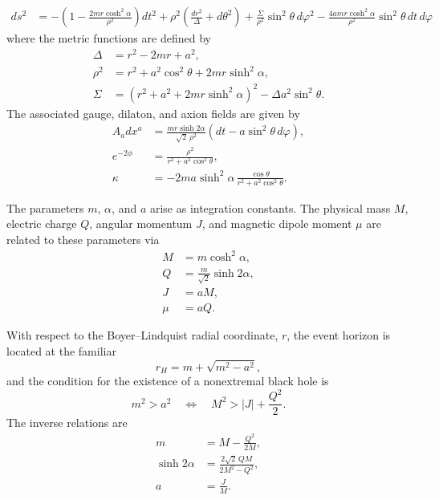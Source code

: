 \begin{align}
ds^2 &= -\left(1-\frac{2mr\cosh^2\alpha}{\rho^2}\right)dt^2 + \rho^2\left(\frac{dr^2}{\Delta}+d\theta^2\right) +\frac{\Sigma}{\rho^2}\sin^2\theta\, d\varphi^2
-\frac{4amr\cosh^2\alpha}{\rho^2}\sin^2\theta\, dt\, d\varphi
\end{align}
where the metric functions are defined by
\begin{align}
\Delta &= r^2 - 2mr + a^2, \\
\rho^2 &= r^2 + a^2\cos^2\theta + 2mr\sinh^2\alpha, \\
\Sigma &= \left(r^2 + a^2 + 2mr\sinh^2\alpha\right)^2
         - \Delta a^2 \sin^2\theta.
\end{align}
The associated gauge, dilaton, and axion fields are given by
\begin{align}
A_a dx^a &= \frac{mr \sinh 2\alpha}{\sqrt{2}\,\rho^2}
\left(dt - a \sin^2\theta \, d\varphi \right), \\
e^{-2\phi} &= \frac{\rho^2}{r^2 + a^2 \cos^2\theta},
\label{Kerr-Sen_dilaton} \\
\kappa &= -2ma \sinh^2\alpha \,
\frac{\cos\theta}{r^2 + a^2 \cos^2\theta}.
\label{Kerr-Sen_axion}
\end{align}

The parameters $m$, $\alpha$, and $a$ arise as integration constants. The physical mass $M$, electric charge $Q$, angular momentum $J$, and magnetic dipole moment $\mu$ are related to these parameters via
\begin{align}
M &= m \cosh^2\alpha, \\
Q &= \frac{m}{\sqrt{2}} \sinh 2\alpha, \\
J &= aM, \\
\mu &= aQ.
\end{align}

With respect to the Boyer--Lindquist radial coordinate, $r$, the event horizon is located at the familiar 
\begin{equation}
r_H = m + \sqrt{m^2 - a^2},
\end{equation}
and the condition for the existence of a nonextremal black hole %
is
\begin{equation}
m^2 > a^2 \quad \Leftrightarrow \quad M^2 > |J| + \frac{Q^2}{2}.
\end{equation}
The inverse relations are
\begin{align}
m &= M - \frac{Q^2}{2M}, \\
\sinh 2\alpha &= \frac{2\sqrt{2}\,QM}{2M^2 - Q^2}, \\
a &= \frac{J}{M}.
\end{align}

